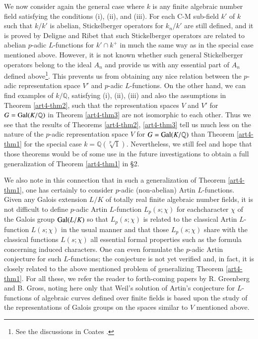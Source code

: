 We now consider again the general case where $k$ is any finite algebraic number field satisfying the conditions (i), (ii), and (iii). For each C-M sub-field $k'$ of $k$ such that $k/k'$ is abelian, Stickelberger operators for $k_{n}/k'$ are still defined, and it is proved by Deligne and Ribet that such Stickelberger operators are related to abelian $p$-adic $L$-functions for $k'\cap k^{+}$ in much the same way as in the special case mentioned above. However, it is not known whether such general Stickelberger operators belong to the ideal $A_{n}$ and provide us with any essential part of $A_{n}$ defined above\footnote[7]{See the discussions in Coates \cite{art4-key1}.}. This prevents us from obtaining any nice relation between the $p$-adic representation space $V'$ and $p$-adic $L$-functions. On the other hand, we can find examples of $k/\mathbb{Q}$, satisfying (i), (ii), (iii) and also the assumptions in Theorem \ref{art4-thm2}, such that the representation spaces $V$ and $V'$ for $G=\operatorname{Gal}(K/\mathbb{Q})$ in Theorem \ref{art4-thm3} are not isomorphic to each other. Thus we see that the results of Theorems \ref{art4-thm2}, \ref{art4-thm3} tell us much less on the nature of the $p$-adic representation space $V$ for $G=\operatorname{Gal}(K/\mathbb{Q})$ than Theorem \ref{art4-thm1} for the special
 case $k=\mathbb{Q}(\sqrt[p]{1})$. Nevertheless, we still feel and hope that those theorems would be of some use in the future investigations to obtain a full generalization of Theorem \ref{art4-thm1} in \S2.

We also note in this connection that in such a generalization of Theorem \ref{art4-thm1}, one has certainly to consider $p$-adic (non-abelian) Artin $L$-functions. Given any Galois extension $L/K$ of totally real finite algebraic number fields, it is not difficult to define $p$-adic Artin $L$-function $L_{p}(s;\chi)$ for each\pageoriginale character $\chi$ of the Galois group $\operatorname{Gal}(L/K)$ so that $L_{p}(s;\chi)$ is related to the classical Artin $L$-function $L(s;\chi)$ in the usual manner and that those $L_{p}(s;\chi)$ share with the classical functions $L(s;\chi)$ all essential formal properties such as the formula concerning induced characters. One can even formulate the $p$-adic Artin conjecture for such $L$-functions; the conjecture is not yet verified and, in fact, it is closely related to the above mentioned problem of generalizing Theorem \ref{art4-thm1}. For all these, we refer the reader to forth-coming papers by R. Greenberg and B. Gross, noting here only that Weil's solution of Artin's conjecture for $L$-functions of algebraic curves defined over finite fields is based upon the study of the representations of Galois groups on the spaces similar to $V$ mentioned above.

